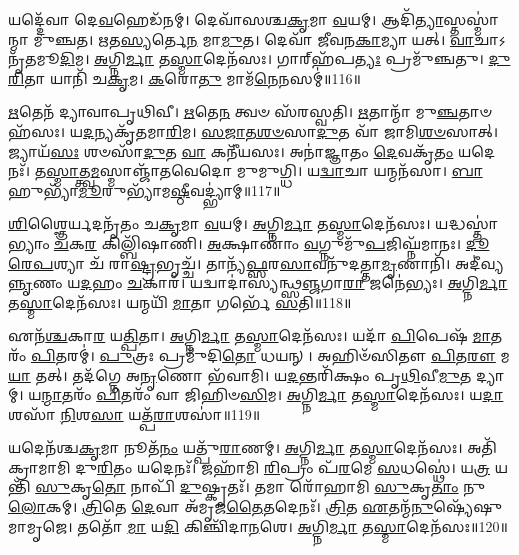 𑌯𑌦𑍍𑌦𑍇᳴𑌵𑌾 𑌦𑍇\-\ul{𑌵}\-𑌹𑍇𑌡᳴𑌨𑌮𑍍।
𑌦𑍇𑌵𑌾᳴𑌸𑌶𑍍𑌚\-\ul{𑌕𑍃}\-𑌮𑌾 \ul{𑌵}\-𑌯𑌮𑍍।
𑌆𑌦𑌿᳴\-\ul{𑌤𑍍𑌯𑌾}\-\-𑌸𑍍𑌤𑌸𑍍𑌮𑌾॑𑌨𑍍𑌮𑌾 𑌮𑍁𑌞𑍍𑌚𑌤।
\-\ul{𑌋}\-𑌤\-\ul{𑌸𑍍𑌯}\-𑌰𑍍𑌤𑍇\-\ul{𑌨} 𑌮𑌾\-\ul{𑌮𑍁}\-𑌤।
𑌦𑍇𑌵𑌾᳴ 𑌜𑍀𑌵𑌨\-\ul{𑌕𑌾}\-𑌮𑍍𑌯𑌾 𑌯𑌤𑍍।
\-\ul{𑌵𑌾}\-𑌚𑌾\-𑌽𑌨𑍃᳴𑌤𑌮𑍂\-\ul{𑌦𑌿}\-𑌮।
\-\ul{𑌅}\-𑌗𑍍𑌨𑌿\-\ul{𑌰𑍍𑌮𑌾} 𑌤\-\ul{𑌸𑍍𑌮𑌾}\-𑌦𑍇𑌨᳴𑌸𑌃।
𑌗𑌾𑌰𑍍‌\mbox{}𑌹᳴𑌪\-\ul{𑌤𑍍𑌯𑌃} 𑌪𑍍𑌰𑌮𑍁᳴𑌞𑍍𑌚𑌤𑍁।
\-\ul{𑌦𑍁}\-\-\ul{𑌰𑌿}\-𑌤𑌾 𑌯𑌾𑌨𑌿᳴ 𑌚\-\ul{𑌕𑍃}\-𑌮।
\-\ul{𑌕}\-𑌰𑍋\-\ul{𑌤𑍁} 𑌮𑌾𑌮᳴\-\ul{𑌨𑍇}\-𑌨𑌸𑌮𑍍॑॥116॥

\-\ul{𑌋}\-𑌤𑍇𑌨᳴ 𑌦𑍍𑌯𑌾𑌵𑌾𑌪𑍃𑌥𑌿𑌵𑍀।
\-\ul{𑌋}\-𑌤𑍇\-\ul{𑌨} 𑌤𑍍𑌵𑍞 𑌸᳴𑌰𑌸𑍍𑌵𑌤𑌿।
\-\ul{𑌋}\-𑌤𑌾𑌨𑍍𑌮𑌾᳴ 𑌮𑍁\-\ul{𑌞𑍍𑌚}\-𑌤𑌾𑍞𑌹᳴𑌸𑌃।
𑌯\-\ul{𑌦}\-𑌨𑍍𑌯𑌕𑍃᳴𑌤𑌮𑌾\-\ul{𑌰𑌿}\-𑌮।
\-\ul{𑌸}\-\-\ul{𑌜𑌾}\-\-\ul{𑌤}\-\-\ul{𑌶}\-\-\ul{𑍞}\-𑌸𑌾\-\ul{𑌦𑍁}\-𑌤 𑌵𑌾᳴ 𑌜𑌾𑌮𑌿\-\ul{𑌶}\-\-\ul{𑍞}\-𑌸𑌾𑌤𑍍।
𑌜𑍍𑌯𑌾𑌯᳴\-\ul{𑌸𑌃} 𑌶𑍞𑌸𑌾᳴\-\ul{𑌦𑍁}\-𑌤 \ul{𑌵𑌾} 𑌕𑌨𑍀᳴𑌯𑌸𑌃।
𑌅𑌨𑌾॑𑌜𑍍𑌞𑌾𑌤𑌂 \ul{𑌦𑍇}\-𑌵𑌕𑍃᳴\-\ul{𑌤𑌂} 𑌯𑌦𑍇𑌨𑌃᳴।
𑌤\-\ul{𑌸𑍍𑌮𑌾}\-𑌤𑍍𑌤𑍍𑌵\-\ul{𑌮}\-𑌸𑍍𑌮𑌾𑌞𑍍𑌜𑌾᳴𑌤𑌵𑍇𑌦𑍋 𑌮𑍁𑌮𑍁𑌗𑍍𑌧𑌿।
𑌯\-\ul{𑌦𑍍𑌵𑌾}\-𑌚𑌾 𑌯𑌨𑍍𑌮𑌨᳴𑌸𑌾।
\-\ul{𑌬𑌾}\-𑌹𑍁𑌭𑍍𑌯𑌾᳴\-\ul{𑌮𑍂}\-𑌰𑍁𑌭𑍍𑌯𑌾᳴𑌮\-\ul{𑌷𑍍𑌠𑍀}\-𑌵𑌦𑍍𑌭𑍍𑌯𑌾॑𑌮𑍍॥117॥

\-\ul{𑌶𑌿}\-𑌶𑍍𑌞𑍈𑌰𑍍𑌯𑌦𑌨𑍃᳴𑌤𑌂 𑌚\-\ul{𑌕𑍃}\-𑌮𑌾 \ul{𑌵}\-𑌯𑌮𑍍।
\-\ul{𑌅}\-𑌗𑍍𑌨𑌿\-\ul{𑌰𑍍𑌮𑌾} 𑌤\-\ul{𑌸𑍍𑌮𑌾}\-𑌦𑍇𑌨᳴𑌸𑌃।
𑌯𑌦𑍍𑌧𑌸𑍍𑌤𑌾॑𑌭𑍍𑌯𑌾𑌂 \ul{𑌚}\-𑌕\-\ul{𑌰} 𑌕𑌿𑌲𑍍𑌬𑌿᳴𑌷𑌾𑌣𑌿।
\-\ul{𑌅}\-𑌕𑍍𑌷𑌾𑌣𑌾𑌂॑ \ul{𑌵}\-𑌗𑍍𑌨𑍁𑌮𑍁᳴\-\ul{𑌪}\-𑌜𑌿𑌘𑍍𑌨᳴𑌮𑌾𑌨𑌃।
\-\ul{𑌦𑍂}\-\-\ul{𑌰𑍇}\-\-\ul{𑌪}\-𑌶𑍍𑌯𑌾 𑌚᳴ 𑌰𑌾\-\ul{𑌷𑍍𑌟𑍍𑌰}\-𑌭𑍃𑌚𑍍𑌚᳴।
𑌤𑌾𑌨𑍍𑌯᳴\-\ul{𑌫𑍍𑌸}\-𑌰\-\ul{𑌸𑌾}\-𑌵𑌨𑍁᳴𑌦𑌤𑍍𑌤𑌾\-\ul{𑌮𑍃}\-𑌣𑌾𑌨𑌿᳴।
𑌅𑌦𑍀॑𑌵𑍍𑌯\-\ul{𑌨𑍍𑌨𑍃}\-𑌣𑌂 𑌯\-\ul{𑌦}\-𑌹𑌂 \ul{𑌚}\-𑌕𑌾𑌰᳴।
𑌯𑌦𑍍𑌵𑌾𑌦𑌾॑𑌸𑍍𑌯𑌨𑍍𑌥𑍍𑌸\-\ul{𑌞𑍍𑌜}\-𑌗𑌾\-\ul{𑌰𑌾} 𑌜𑌨𑍇॑𑌭𑍍𑌯𑌃।
\-\ul{𑌅}\-𑌗𑍍𑌨𑌿\-\ul{𑌰𑍍𑌮𑌾} 𑌤\-\ul{𑌸𑍍𑌮𑌾}\-𑌦𑍇𑌨᳴𑌸𑌃।
𑌯𑌨𑍍𑌮𑌯𑌿᳴ \ul{𑌮𑌾}\-𑌤𑌾 𑌗𑌰𑍍𑌭𑍇᳴ \ul{𑌸}\-𑌤𑌿॥118॥

𑌏𑌨᳴\-\ul{𑌶𑍍𑌚}\-𑌕𑌾\-\ul{𑌰} 𑌯\-\ul{𑌤𑍍𑌪𑌿}\-𑌤𑌾।
\-\ul{𑌅}\-𑌗𑍍𑌨𑌿\-\ul{𑌰𑍍𑌮𑌾} 𑌤\-\ul{𑌸𑍍𑌮𑌾}\-𑌦𑍇𑌨᳴𑌸𑌃।
𑌯𑌦𑌾᳴ \ul{𑌪𑌿}\-𑌪𑍇𑌷᳴ \ul{𑌮𑌾}\-𑌤𑌰𑌂᳴ \ul{𑌪𑌿}\-𑌤𑌰𑌮𑍍॑।
\-\ul{𑌪𑍁}\-𑌤𑍍𑌰𑌃 𑌪𑍍𑌰𑌮𑍁᳴𑌦𑌿\-\ul{𑌤𑍋} 𑌧𑌯𑌨𑍍।
𑌅𑌹𑌿𑍞᳴𑌸𑌿𑌤𑍗 \ul{𑌪𑌿}\-𑌤\-\ul{𑌰𑍗} 𑌮\-\ul{𑌯𑌾} 𑌤𑌤𑍍।
𑌤𑌦᳴𑌗𑍍𑌨𑍇 𑌅\-\ul{𑌨𑍃}\-𑌣𑍋 𑌭᳴𑌵𑌾𑌮𑌿।
𑌯\-\ul{𑌦}\-𑌨𑍍𑌤𑌰𑌿᳴𑌕𑍍𑌷𑌂 𑌪𑍃\-\ul{𑌥𑌿}\-𑌵𑍀\-\ul{𑌮𑍁}\-𑌤 𑌦𑍍𑌯𑌾𑌮𑍍।
𑌯\-\ul{𑌨𑍍𑌮𑌾}\-𑌤𑌰𑌂᳴ \ul{𑌪𑌿}\-𑌤𑌰𑌂᳴ 𑌵𑌾 𑌜𑌿𑌹𑌿𑍞\-\ul{𑌸𑌿}\-𑌮।
\-\ul{𑌅}\-𑌗𑍍𑌨𑌿\-\ul{𑌰𑍍𑌮𑌾} 𑌤\-\ul{𑌸𑍍𑌮𑌾}\-𑌦𑍇𑌨᳴𑌸𑌃।
𑌯\-\ul{𑌦𑌾}\-𑌶𑌸𑌾᳴ \ul{𑌨𑌿}\-𑌶\-\ul{𑌸𑌾} 𑌯𑌤𑍍𑌪᳴\-\ul{𑌰𑌾}\-𑌶𑌸𑌾॑॥119॥

𑌯𑌦𑍇𑌨᳴𑌶𑍍𑌚\-\ul{𑌕𑍃}\-𑌮𑌾 𑌨𑍂𑌤᳴\-\ul{𑌨𑌂} 𑌯𑌤𑍍𑌪𑍁᳴\-\ul{𑌰𑌾}\-𑌣𑌮𑍍।
\-\ul{𑌅}\-𑌗𑍍𑌨𑌿\-\ul{𑌰𑍍𑌮𑌾} 𑌤\-\ul{𑌸𑍍𑌮𑌾}\-𑌦𑍇𑌨᳴𑌸𑌃।
𑌅𑌤𑌿᳴ 𑌕𑍍𑌰𑌾𑌮𑌾𑌮𑌿 𑌦𑍁\-\ul{𑌰𑌿}\-𑌤𑌂 𑌯𑌦𑍇𑌨𑌃᳴।
𑌜𑌹𑌾᳴𑌮𑌿 \ul{𑌰𑌿}\-𑌪𑍍𑌰𑌂 𑌪᳴\-\ul{𑌰}\-𑌮𑍇 \ul{𑌸}\-𑌧𑌸𑍍𑌥𑍇॑।
𑌯\-\ul{𑌤𑍍𑌰} 𑌯𑌨𑍍𑌤𑌿᳴ \ul{𑌸𑍁}\-𑌕𑍃\-\ul{𑌤𑍋} 𑌨𑌾𑌪𑌿᳴ \ul{𑌦𑍁}\-𑌷𑍍𑌕𑍃𑌤𑌃᳴।
𑌤𑌮𑌾 𑌰𑍋᳴𑌹𑌾𑌮𑌿 \ul{𑌸𑍁}\-𑌕𑍃\-\ul{𑌤𑌾𑌂} 𑌨𑍁 \ul{𑌲𑍋}\-𑌕𑌮𑍍।
\-\ul{𑌤𑍍𑌰𑌿}\-𑌤𑍇 \ul{𑌦𑍇}\-𑌵𑌾 𑌅᳴𑌮𑍃𑌜\-\ul{𑌤𑍈}\-𑌤𑌦𑍇𑌨𑌃᳴।
\-\ul{𑌤𑍍𑌰𑌿}\-𑌤 \ul{𑌏}\-𑌤𑌨𑍍𑌮᳴\-\ul{𑌨𑍁}\-𑌷𑍍𑌯𑍇᳴𑌷𑍁 𑌮𑌾𑌮𑍃𑌜𑍇।
𑌤𑌤𑍋᳴ \ul{𑌮𑌾} 𑌯\-\ul{𑌦𑌿} 𑌕𑌿𑌞𑍍𑌚𑌿᳴𑌦𑌾\-\ul{𑌨}\-𑌶𑍇।
\-\ul{𑌅}\-𑌗𑍍𑌨𑌿\-\ul{𑌰𑍍𑌮𑌾} 𑌤\-\ul{𑌸𑍍𑌮𑌾}\-𑌦𑍇𑌨᳴𑌸𑌃॥120॥

